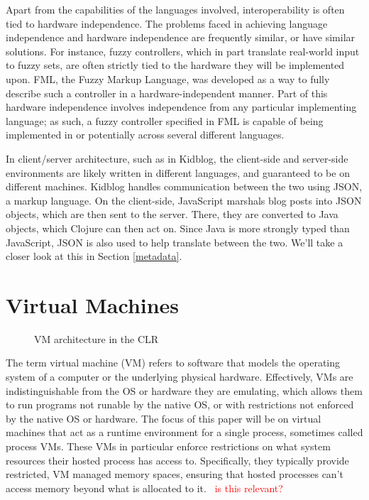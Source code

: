 \documentclass{sig-alternate}
\newcommand{\mycomment}[1]{\textcolor{red}{#1}}
\begin{document}
Apart from the capabilities of the languages involved, interoperability is often tied to hardware independence. The problems faced in achieving language independence and hardware independence are frequently similar, or have similar solutions. For instance, fuzzy controllers, which in part translate real-world input to fuzzy sets, are often strictly tied to the hardware they will be implemented upon. FML, the Fuzzy Markup Language, was developed as a way to fully describe such a controller in a hardware-independent manner. Part of this hardware independence involves independence from any particular implementing language; as such, a fuzzy controller specified in FML is capable of being implemented in or potentially across several different languages.~\cite{Acampora:2013}

In client/server architecture, such as in Kidblog, the client-side and server-side environments are likely written in different languages, and guaranteed to be on different machines. Kidblog handles communication between the two using JSON, a markup language. On the client-side, JavaScript marshals blog posts into JSON objects, which are then sent to the server. There, they are converted to Java objects, which Clojure can then act on. Since Java is more strongly typed than JavaScript, JSON is also used to help translate between the two. We'll take a closer look at this in Section \ref{metadata}.


\section{Virtual Machines}\label{VM}
\begin{figure}
\caption{VM architecture in the CLR~\cite{wiki:CLR}}
\label{VMmodel}
\end{figure}

The term virtual machine (VM) refers to software that models the operating system of a computer or the underlying physical hardware. Effectively, VMs are indistinguishable from the OS or hardware they are emulating, which allows them to run programs not runable by the native OS, or with restrictions not enforced by the native OS or hardware.
The focus of this paper will be on virtual machines that act as a runtime environment for a single process, sometimes called process VMs. These VMs in particular enforce restrictions on what system resources their hosted process has access to. Specifically, they typically provide restricted, VM managed memory spaces, ensuring that hosted processes can't access memory beyond what is allocated to it.~\cite{wiki:VM} \mycomment{is this relevant?}
\end{document}
